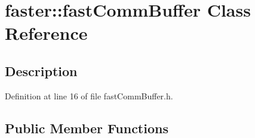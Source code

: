 \hypertarget{classfaster_1_1fastCommBuffer}{}\section{faster\+:\+:fast\+Comm\+Buffer Class Reference}
\label{classfaster_1_1fastCommBuffer}


\subsection{Description}


Definition at line 16 of file fast\+Comm\+Buffer.\+h.

\subsection*{Public Member Functions}
